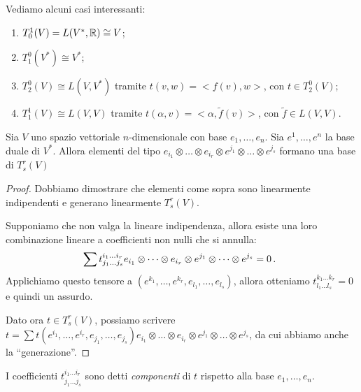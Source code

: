 \begin{example}
	Vediamo alcuni casi interessanti:
	\begin{enumerate}
		\item $T_0^1(V) = L(V^*,\mathbb R) \cong V$;
		\item $T_1^0(V^*) \cong V^*$;
		\item $T_2^0(V) \cong L(V,V^*)$ tramite $t(v,w) = <f(v),w>$, con $t\in T_2^0(V)$;
		\item $T_1^1(V) \cong L(V,V)$ tramite $t(\alpha,v) = <\alpha, \tilde f (v)>$, con $\tilde f\in L(V,V)$.
	\end{enumerate}
\end{example}

\begin{proposition}
	Sia $V$ uno spazio vettoriale $n$-dimensionale con base $e_1,\dots,e_n$. Sia $e^1,\dots,e^n$ la base duale di $V^*$. Allora elementi del tipo $e_{i_1}\otimes \dots \otimes e_{i_r}\otimes e^{j_1}\otimes \dots \otimes e^{j_s}$ formano una base di $T_s^r(V)$
\end{proposition}
\begin{proof}
	Dobbiamo dimostrare che elementi come sopra sono linearmente indipendenti e generano linearmente $T_s^r(V)$.
	
	Supponiamo che non valga la lineare indipendenza, allora esiste una loro combinazione lineare a coefficienti non nulli che si annulla:
	\begin{equation*}
		\sum t_{j_1\dots j_s}^{i_1\dots i_r} e_{i_1}\otimes \dots \otimes e_{i_r}\otimes e^{j_1}\otimes \dots \otimes e^{j_s} = 0\, \text{. }
	\end{equation*}
	Applichiamo questo tensore a $(e^{k_1},\dots,e^{k_r},e_{l_1},\dots,e_{l_s})$, allora otteniamo $t_{l_1\dots l_s}^{k_1 \dots k_r} = 0$ e quindi un assurdo.
	
	Dato ora $t\in T_s^r(V)$, possiamo scrivere $t = \sum t(e^{i_1},\dots, e^{i_r},e_{j_1},\dots, e_{j_s})e_{i_1}\otimes \dots \otimes e_{i_r}\otimes e^{j_1}\otimes \dots \otimes e^{j_s}$, da cui abbiamo anche la ``generazione''.
\end{proof}

\begin{definition}
	I coefficienti $t_{j_1\dots j_s}^{i_1\dots i_r}$ sono detti \emph{componenti} di $t$ rispetto alla base $e_1,\dots,e_n$.
\end{definition}

